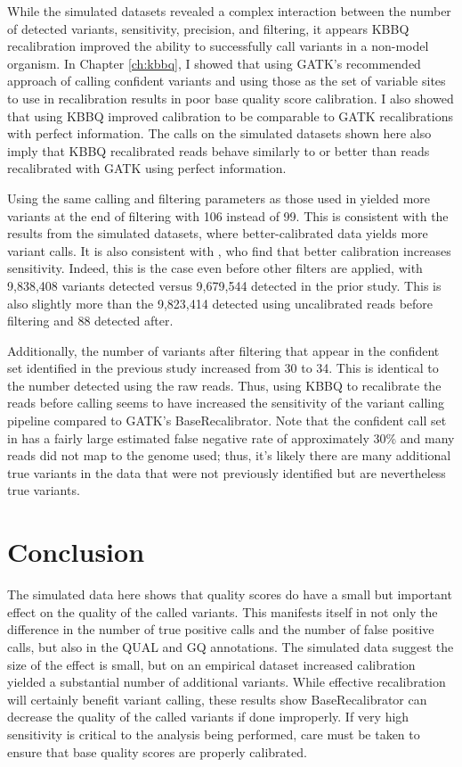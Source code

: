 While the simulated datasets revealed a complex interaction between the number of detected variants, sensitivity, precision, and filtering, it appears KBBQ recalibration improved the ability to successfully call variants in a non-model organism. In Chapter \ref{ch:kbbq}, I showed that using GATK's recommended approach of calling confident variants and using those as the set of variable sites to use in recalibration results in poor base quality score calibration. I also showed that using KBBQ improved calibration to be comparable to GATK recalibrations with perfect information. The calls on the simulated datasets shown here also imply that KBBQ recalibrated reads behave similarly to or better than reads recalibrated with GATK using perfect information.

Using the same calling and filtering parameters as those used in \cite{orr_phylogenomic_2020} yielded more variants at the end of filtering with 106 instead of 99. This is consistent with the results from the simulated datasets, where better-calibrated data yields more variant calls. It is also consistent with \cite{ni_improvement_2016}, who find that better calibration increases sensitivity. Indeed, this is the case even before other filters are applied, with 9,838,408 variants detected versus 9,679,544 detected in the prior study. This is also slightly more than the 9,823,414 detected using uncalibrated reads before filtering and 88 detected after.

Additionally, the number of variants after filtering that appear in the confident set identified in the previous study increased from 30 to 34. This is identical to the number detected using the raw reads. Thus, using KBBQ to recalibrate the reads before calling seems to have increased the sensitivity of the variant calling pipeline compared to GATK's BaseRecalibrator. Note that the confident call set in \cite{orr_phylogenomic_2020} has a fairly large estimated false negative rate of approximately 30\% and many reads did not map to the genome used; thus, it's likely there are many additional true variants in the data that were not previously identified but are nevertheless true variants.

\section{Conclusion}

The simulated data here shows that quality scores do have a small but important effect on the quality of the called variants. This manifests itself in not only the difference in the number of true positive calls and the number of false positive calls, but also in the QUAL and GQ annotations. The simulated data suggest the size of the effect is small, but on an empirical dataset increased calibration yielded a substantial number of additional variants. While effective recalibration will certainly benefit variant calling, these results show BaseRecalibrator can decrease the quality of the called variants if done improperly. If very high sensitivity is critical to the analysis being performed, care must be taken to ensure that base quality scores are properly calibrated.

\printbibliography[segment=\therefsegment]{}
